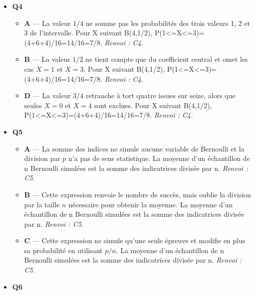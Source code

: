 \begin{itemize}
\begin{itemize}
    \item \textbf{C} — La valeur $1/2$ ne résulte pas de la formule binomiale et confond le paramètre $p$ avec la probabilité de deux succès. Pour X suivant B(3,1/2), P(X=2)=C(3,2)(1/2)\textasciicircum{}2(1/2)=3/8. \emph{Renvoi : C3.}
    \item \textbf{D} — La valeur $3/4$ oublie le facteur $(1/2)^3$ associé aux trois résultats de chaque configuration. Pour X suivant B(3,1/2), P(X=2)=C(3,2)(1/2)\textasciicircum{}2(1/2)=3/8. \emph{Renvoi : C3.}
  \end{itemize}
  \item \textbf{Q4}
  \begin{itemize}
    \item \textbf{A} — La valeur $1/4$ ne somme pas les probabilités des trois valeurs 1, 2 et 3 de l'intervalle. Pour X suivant B(4,1/2), P(1<=X<=3)=(4+6+4)/16=14/16=7/8. \emph{Renvoi : C4.}
    \item \textbf{B} — La valeur $1/2$ ne tient compte que du coefficient central et omet les cas $X=1$ et $X=3$. Pour X suivant B(4,1/2), P(1<=X<=3)=(4+6+4)/16=14/16=7/8. \emph{Renvoi : C4.}
    \item \textbf{D} — La valeur $3/4$ retranche à tort quatre issues sur seize, alors que seules $X=0$ et $X=4$ sont exclues. Pour X suivant B(4,1/2), P(1<=X<=3)=(4+6+4)/16=14/16=7/8. \emph{Renvoi : C4.}
  \end{itemize}
  \item \textbf{Q5}
  \begin{itemize}
    \item \textbf{A} — La somme des indices ne simule aucune variable de Bernoulli et la division par $p$ n'a pas de sens statistique. La moyenne d'un échantillon de n Bernoulli simulées est la somme des indicatrices divisée par n. \emph{Renvoi : C5.}
    \item \textbf{B} — Cette expression renvoie le nombre de succès, mais oublie la division par la taille $n$ nécessaire pour obtenir la moyenne. La moyenne d'un échantillon de n Bernoulli simulées est la somme des indicatrices divisée par n. \emph{Renvoi : C5.}
    \item \textbf{C} — Cette expression ne simule qu'une seule épreuve et modifie en plus sa probabilité en utilisant $p/n$. La moyenne d'un échantillon de n Bernoulli simulées est la somme des indicatrices divisée par n. \emph{Renvoi : C5.}
  \end{itemize}
  \item \textbf{Q6}
  \begin{itemize}

\end{itemize}
\end{itemize}
